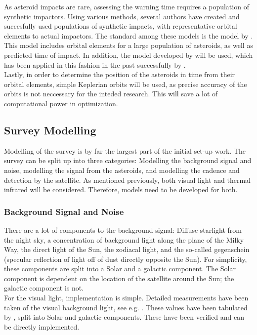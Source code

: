 \documentclass[12pt, english, NoHyper]{AE4010-template}
\begin{document}
As asteroid impacts are rare, assessing the warning time requires a population of synthetic impactors. Using various methods, several authors have created and succesfully used populations of synthetic impacts, with representative orbital elements to actual impactors. The standard among these models is the model by \cite{ChelseyPop}. This model includes orbital elements for a large population of asteroids, as well as predicted time of impact. In addition, the model developed by \cite{Flyeye} will be used, which has been applied in this fashion in the past successfully by \cite{ThesisOlga}.\\

Lastly, in order to determine the position of the asteroids in time from their orbital elements, simple Keplerian orbits will be used, as precise accuracy of the orbits is not neccessary for the inteded research. This will save a lot of computational power in optimization.


\subsection{Survey Modelling}
Modelling of the survey is by far the largest part of the initial set-up work. The survey can be split up into three categories: Modelling the background signal and noise, modelling the signal from the asteroids, and modelling the cadence and detection by the satellite. As mentioned previously, both visual light and thermal infrared will be considered. Therefore, models need to be developed for both.

\subsubsection{Background Signal and Noise}
There are a lot of components to the background signal: Diffuse starlight from the night sky, a concentration of background light along the plane of the Milky Way, the direct light of the Sun, the zodiacal light, and the so-called gegenschein (specular reflection of light off of dust directly opposite the Sun). For simplicity, these components are split into a Solar and a galactic component. The Solar component is dependent on the location of the satellite around the Sun; the galactic component is not. \\

For the visual light, implementation is simple. Detailed measurements have been taken of the visual background light, see e.g. \cite{LightOfTheNightSky}. These values have been tabulated by \cite{DiffuseSkyBrightness}, split into Solar and galactic components. These have been verified and can be directly implemented. \\
\end{document}
